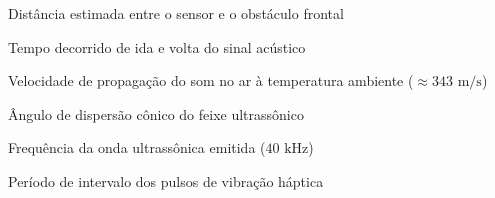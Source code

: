 \begin{simbolos}
  \item[$d$] Distância estimada entre o sensor e o obstáculo frontal
  \item[$t$] Tempo decorrido de ida e volta do sinal acústico
  \item[$v$] Velocidade de propagação do som no ar à temperatura ambiente ($\approx 343\text{ m/s}$)
  \item[$\theta$] Ângulo de dispersão cônico do feixe ultrassônico
  \item[$f$] Frequência da onda ultrassônica emitida ($40\text{ kHz}$)
  \item[$T$] Período de intervalo dos pulsos de vibração háptica
\end{simbolos}
